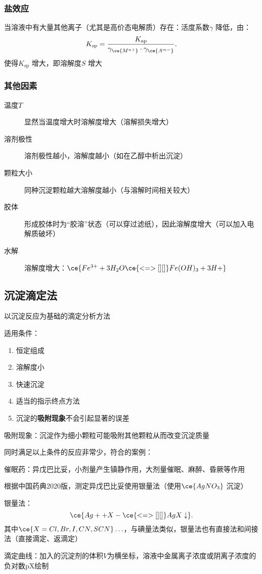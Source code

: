 \subsubsection*{盐效应}%
\label{subsub:盐效应}
\begin{defi}
当溶液中有大量其他离子（尤其是高价态电解质）存在：活度系数$\gamma$ 降低，由：\[
    K_\text{sp}=\frac{K_\text{ap}}{\gamma_{\ce{M^{n+}}}\cdot \gamma_{\ce{A^{m-}}}}
.\]
使得$K_\text{sp}$ 增大，即溶解度$S$ 增大
\end{defi}
\subsubsection*{其他因素}%
\label{subsub:其他因素}
\begin{description}
    \item [温度$T$] 显然当温度增大时溶解度增大（溶解损失增大）
    \item [溶剂极性] 溶剂极性越小，溶解度越小（如在乙醇中析出沉淀）
    \item [颗粒大小] 同种沉淀颗粒越大溶解度越小（与溶解时间相关较大）
    \item [胶体] 形成胶体时为“胶溶”状态（可以穿过滤纸），因此溶解度增大（可以加入电解质破坏）
    \item [水解] 溶解度增大：$\ce{Fe^{3+} + 3H_2O \ce{<=>[][]} Fe(OH)_3 +3H+}$
\end{description}
\subsection{沉淀滴定法}%
\label{sub:沉淀滴定法}
\begin{defi}
    以沉淀反应为基础的滴定分析方法
\end{defi}
适用条件：
\begin{enumerate}
    \item 恒定组成
    \item 溶解度小
    \item 快速沉淀
    \item 适当的指示终点方法
    \item 沉淀的\textbf{吸附现象}不会引起显著的误差
\end{enumerate}
\begin{notation}
    吸附现象：沉淀作为细小颗粒可能吸附其他颗粒从而改变沉淀质量
\end{notation}
同时满足以上条件的反应非常少，符合的案例：
\begin{notation}
    催眠药：异戊巴比妥，小剂量产生镇静作用，大剂量催眠、麻醉、昏厥等作用

    根据中国药典2020版，测定异戊巴比妥使用银量法（使用$\ce{AgNO_3}$ 沉淀）
\end{notation}
\begin{eg}
    银量法：\[
        \ce{Ag+ +X- \ce{<=>[][]} AgX \downarrow}
    .\]
    其中$\ce{X=Cl, Br, I, CN, SCN}\ldots $，与碘量法类似，银量法也有直接法和间接法（直接滴定、返滴定）
\end{eg}
\begin{notation}
    滴定曲线：加入的沉淀剂的体积$V$为横坐标，溶液中金属离子浓度或阴离子浓度的负对数pX绘制
\end{notation}
